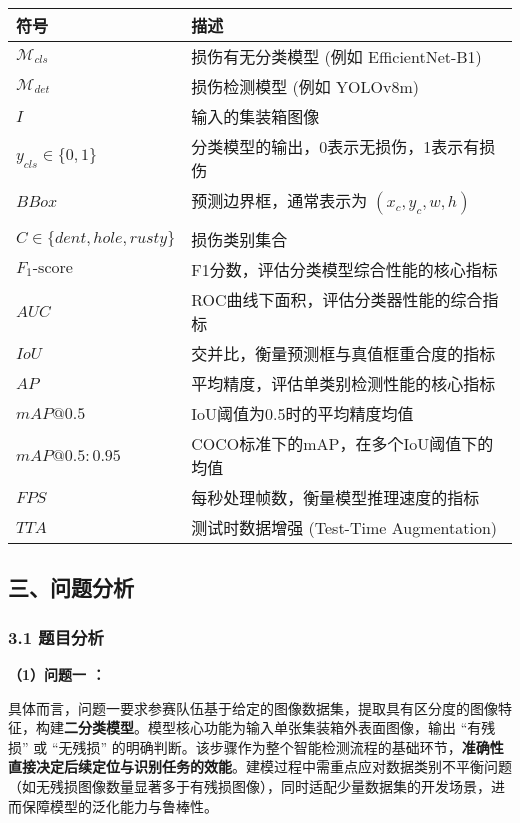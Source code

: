 \documentclass[
]{article}
\begin{document}
\begin{longtable}[]{@{}ll@{}}
\toprule\noalign{}
符号 & 描述 \\
\midrule\noalign{}
\endhead
\bottomrule\noalign{}
\endlastfoot
\(\mathcal{M}_{cls}\) & 损伤有无分类模型 (例如 EfficientNet-B1) \\
\(\mathcal{M}_{det}\) & 损伤检测模型 (例如 YOLOv8m) \\
\(I\) & 输入的集装箱图像 \\
\(y_{cls} \in \{0, 1\}\) & 分类模型的输出，0表示无损伤，1表示有损伤 \\
\(BBox\) & 预测边界框，通常表示为 \((x_c, y_c, w, h)\) \\
& \\
\(C \in \{dent, hole, rusty\}\) & 损伤类别集合 \\
\(F_1\text{-score}\) & F1分数，评估分类模型综合性能的核心指标 \\
\(AUC\) & ROC曲线下面积，评估分类器性能的综合指标 \\
\(IoU\) & 交并比，衡量预测框与真值框重合度的指标 \\
\(AP\) & 平均精度，评估单类别检测性能的核心指标 \\
\(mAP@0.5\) & IoU阈值为0.5时的平均精度均值 \\
\(mAP@0.5:0.95\) & COCO标准下的mAP，在多个IoU阈值下的均值 \\
\(FPS\) & 每秒处理帧数，衡量模型推理速度的指标 \\
\(TTA\) & 测试时数据增强 (Test-Time Augmentation) \\
\end{longtable}

\subsection{三、问题分析}\label{ux4e09ux95eeux9898ux5206ux6790}

\subsubsection{3.1 题目分析}\label{31-ux9898ux76eeux5206ux6790}

\textbf{（1）问题一 ：}

具体而言，问题一要求参赛队伍基于给定的图像数据集，提取具有区分度的图像特征，构建\textbf{二分类模型}。模型核心功能为输入单张集装箱外表面图像，输出
``有残损'' 或 ``无残损''
的明确判断。该步骤作为整个智能检测流程的基础环节，\textbf{准确性直接决定后续定位与识别任务的效能}。建模过程中需重点应对数据类别不平衡问题（如无残损图像数量显著多于有残损图像），同时适配少量数据集的开发场景，进而保障模型的泛化能力与鲁棒性。
\end{document}
